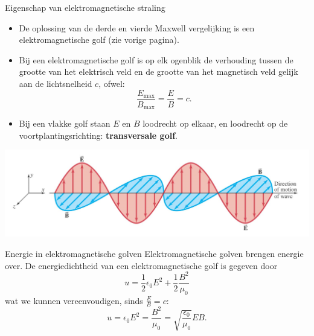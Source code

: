 \begin{pro}{Eigenschap van elektromagnetische straling}
    \begin{itemize}
        \item
            De oplossing van de derde en vierde Maxwell vergelijking is een elektromagnetische golf (zie vorige pagina).
        \item 
            Bij een elektromagnetische golf is op elk ogenblik de verhouding tussen de grootte van het elektrisch veld en de grootte van het magnetisch veld gelijk aan de lichtsnelheid $ c $, ofwel:
            \begin{equation*}
                \frac{E_{\text{max}}}{B_{\text{max}}} = \frac{E}{B} = c.
            \end{equation*}
        \item 
            Bij een vlakke golf staan $E$ en $B$ loodrecht op elkaar, en loodrecht op de voortplantingsrichting: \textbf{transversale golf}.
    \end{itemize}
    \begin{center}
        \includegraphics[scale = 0.175]{Images/Magnetisme/ElektromagnetischeStraling.png}
    \end{center}
    \vspace{-0.3cm}
\end{pro}

\begin{theo}{Energie in elektromagnetische golven}
    Elektromagnetische golven brengen energie over. De energiedichtheid van een elektromagnetische golf is gegeven door
    \begin{equation*}
        u = \frac{1}{2}\epsilon_0 E^2 + \frac{1}{2}\frac{B^2}{\mu_0}
    \end{equation*}
    wat we kunnen vereenvoudigen, sinds $\frac{E}{B}=c$:
    \begin{equation*}
        u = \epsilon_0 E^2 = \frac{B^2}{\mu_0} = \sqrt{\frac{\epsilon_0}{\mu_0}}EB.
    \end{equation*}
    \vspace{-0.3cm}
\end{theo}

